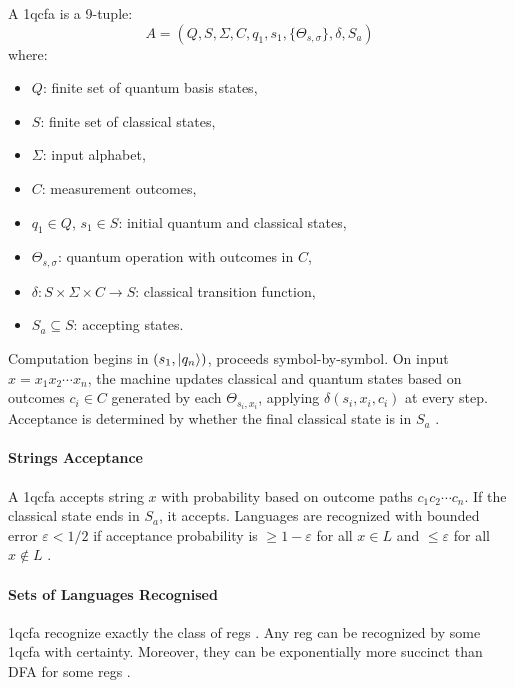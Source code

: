 \begin{definition}
A \gls{1qcfa} is a 9-tuple:
\[
A = (Q, S, \Sigma, C, q_1, s_1, \{\Theta_{s,\sigma}\}, \delta, S_a)
\]
where:
\begin{itemize}
    \item $Q$: finite set of quantum basis states,
    \item $S$: finite set of classical states,
    \item $\Sigma$: input alphabet,
    \item $C$: measurement outcomes,
    \item $q_1 \in Q$, $s_1 \in S$: initial quantum and classical states,
    \item $\Theta_{s,\sigma}$: quantum operation with outcomes in $C$,
    \item $\delta: S \times \Sigma \times C \to S$: classical transition function,
    \item $S_a \subseteq S$: accepting states.
\end{itemize}
\end{definition}

Computation begins in $(s_1, \ket{q_n})$, proceeds symbol-by-symbol. On input $x = x_1x_2\cdots x_n$, the machine updates classical and quantum states based on outcomes $c_i \in C$ generated by each $\Theta_{s_i,x_i}$, applying $\delta(s_i,x_i,c_i)$ at every step. Acceptance is determined by whether the final classical state is in $S_a$ \cite{li2015hybrid}.

\paragraph{Strings Acceptance}  
A \gls{1qcfa} accepts string $x$ with probability based on outcome paths $c_1c_2\cdots c_n$. If the classical state ends in $S_a$, it accepts. Languages are recognized with bounded error $\varepsilon < 1/2$ if acceptance probability is $\geq 1-\varepsilon$ for all $x \in L$ and $\leq \varepsilon$ for all $x \notin L$ \cite{li2015hybrid, zheng2012one}.

\paragraph{Sets of Languages Recognised}  
\gls{1qcfa} recognize exactly the class of \glspl{reg} \cite{zheng2012one}. Any \gls{reg} can be recognized by some \gls{1qcfa} with certainty. Moreover, they can be exponentially more succinct than DFA for some \glspl{reg} \cite{xiao2021state}.

